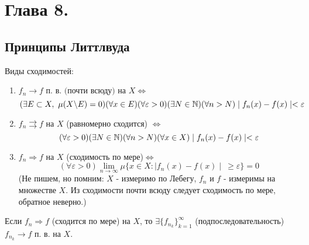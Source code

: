 \setcounter{section}{7}
\section{Глава 8.}
\setcounter{subsection}{6}
\subsection{Принципы Литтлвуда}
Виды сходимостей:
\begin{enumerate}
    \item $f_n \rightarrow f \text{ п. в. (почти всюду) на } X \Leftrightarrow$ $$(\exists E\subset X,\  \mu (X\backslash E)=0)(\forall x \in E)(\forall \varepsilon > 0)(\exists N \in \N)(\forall n>N) \mid f_n(x)-f(x)\mid<\varepsilon$$
    \item $f_n \rightrightarrows f$ на $X$ (равномерно сходится) $\Leftrightarrow$ 
    $$(\forall \varepsilon > 0)(\exists N \in \N)(\forall n>N)(\forall x \in X) \mid f_n(x)-f(x)\mid<\varepsilon$$
    \item $f_n \Rightarrow f$ на $X$ (сходимость по мере)$\Leftrightarrow$
    $$(\forall \varepsilon > 0) \lim_{n\to\infty} \mu \{ x\in X: \mid f_n(x)-f(x)\mid \ \geqslant \varepsilon \} =0$$
    (Не пишем, но помним: $X$ - измеримо по Лебегу, $f_n$ и $f$ - измеримы на множестве $X$. Из сходимости почти всюду следует сходимость по мере, обратное неверно.)
\end{enumerate}
\begin{theorem}[Ф. Рисса]
    Если $f_n \Rightarrow f$ (сходится по мере) на $X$, то $\exists \{f_{n_k} \} ^\infty_{k=1}$ (подпоследовательность) $f_{n_k} \rightarrow f$ п. в. на $X$.
\end{theorem}
